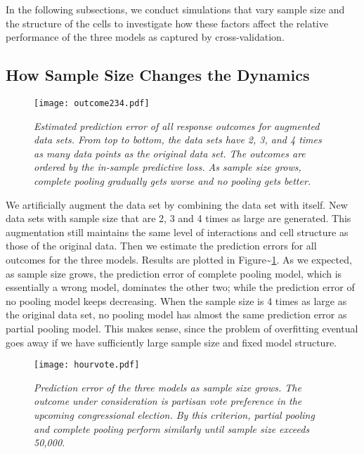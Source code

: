 In the following subsections, we conduct simulations that vary sample
size and the structure of the cells to investigate how these factors
affect the relative performance of the three models as captured by
cross-validation.

\subsection{How Sample Size Changes the
Dynamics}\label{how-sample-size-changes-the-dynamics}

\begin{figure}[p!]
  \centering
  \texttt{[image: outcome234.pdf]}
  \caption{\em Estimated prediction error of all response outcomes for augmented
    data sets. From top to bottom, the data sets have 2, 3, and 4 times as many
    data points as the original data set. The outcomes are ordered by the
    in-sample predictive loss. As sample size grows, complete pooling
    gradually gets worse and no pooling gets better.}
  \label{fig:figx234}
  \end{figure}

We artificially augment the data set by combining the data set with
itself. New data sets with sample size that are 2, 3 and 4 times as
large are generated. This augmentation still maintains the same level of
interactions and cell structure as those of the original data. Then we
estimate the prediction errors for all outcomes for the three models.
Results are plotted in Figure\textasciitilde{}\ref{fig:figx234}. As we
expected, as sample size grows, the prediction error of complete pooling
model, which is essentially a wrong model, dominates the other two;
while the prediction error of no pooling model keeps decreasing. When
the sample size is 4 times as large as the original data set, no pooling
model has almost the same prediction error as partial pooling model.
This makes sense, since the problem of overfitting eventual goes away if
we have sufficiently large sample size and fixed model structure.

\begin{figure*}[p!]
  \centering
  \texttt{[image: hourvote.pdf]}
  \caption{\em Prediction error of the three models as sample size grows. The
    outcome under consideration is partisan vote preference in the upcoming
    congressional election. By this criterion, partial pooling and complete
    pooling perform similarly until sample size exceeds 50,000.}
  \label{fig:hourvote}
\end{figure*}

